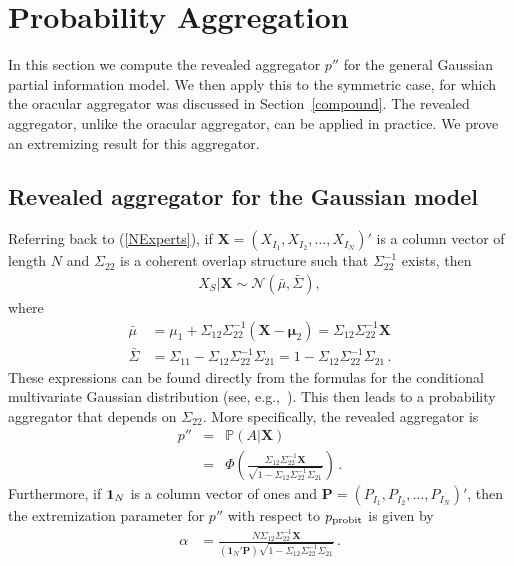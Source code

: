 \documentclass[11pt]{article}
\renewcommand{\P}{\mathbb{P}}
\theoremstyle{definition}
\theoremstyle{definition}
\def\one{{\bf 1}}
\def\P{{\mathbb P}}
\def\probit{p_{\rm probit}}
\begin{document}
\section{Probability Aggregation}
\label{aggregation}

In this section we compute the revealed aggregator $p''$ for 
the general Gaussian partial information model.  We then apply 
this to the symmetric case, for which the oracular aggregator 
was discussed in Section~\ref{compound}.  The revealed aggregator, 
unlike the oracular aggregator, can be applied in practice.  
We prove an extremizing result for this aggregator.

\subsection{Revealed aggregator for the Gaussian model}

Referring back to (\ref{NExperts}), if $\boldsymbol{X} = 
(X_{I_1}, X_{I_2},  \dots, X_{I_N})'$ is a column vector 
of length $N$ and $\Sigma_{22}$ is a coherent overlap structure 
such that $\Sigma_{22}^{-1}$ exists, then 
\begin{align*}
X_{S} | \boldsymbol{X} \sim \mathcal{N}\left(\bar{\mu}, \bar{\Sigma}\right), 
\end{align*}
where
\begin{align*}
\bar{\mu} &= \mu_1 + \Sigma_{12} \Sigma_{22}^{-1} 
  (\boldsymbol{X} - \boldsymbol{\mu}_2) 
  = \Sigma_{12} \Sigma_{22}^{-1} \boldsymbol{X} \\
 \bar{\Sigma}&= \Sigma_{11} - \Sigma_{12} \Sigma_{22}^{-1} \Sigma_{21} 
 = 1 - \Sigma_{12} \Sigma_{22}^{-1} \Sigma_{21}   \, .
\end{align*}
These expressions can be found directly from the formulas for
the conditional multivariate Gaussian distribution (see, 
e.g.,~\citealt[Result~5.2.10, page~156]{ravishanker2001first}). 
This then leads to a probability aggregator that depends on 
$\Sigma_{22}$.  More specifically, the revealed aggregator is
\begin{eqnarray}
p'' & = & \P\left(A  | \boldsymbol{X}\right)  \nonumber \\
&=& \Phi\left( \frac{\Sigma_{12} \Sigma_{22}^{-1} \boldsymbol{X}}
   {\sqrt{1 - \Sigma_{12} \Sigma_{22}^{-1} \Sigma_{21}}}\right) 
\label{GeneralAggregator} \, .
\end{eqnarray}
Furthermore, if $\one_N$ is a column vector of ones and 
$\boldsymbol{P} = (P_{I_1}, P_{I_2}, \dots, P_{I_N})'$, 
then the extremization parameter for $p''$ with respect to
$\probit$ is given by 
\begin{align*}
\alpha  &= \frac{N \Sigma_{12} \Sigma_{22}^{-1} 
  \boldsymbol{X}}{\left(\boldsymbol{1}_N' \boldsymbol{P} \right) 
  \sqrt{1 - \Sigma_{12} \Sigma_{22}^{-1} \Sigma_{21}}}  \, .
\end{align*}
\end{document}
